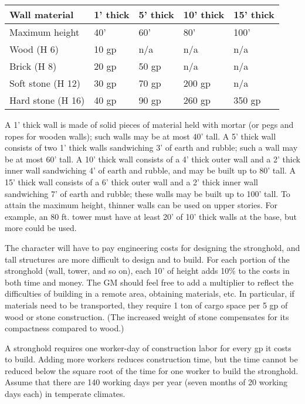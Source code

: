 \documentclass[a4paper,twoside,openany,10pt]{book}
\begin{document}
\begin{multicols}{2}
\begin{tabularx}{0.45\textwidth}{@{}lXXXX@{}}
\textbf{Wall material} & \textbf{1' thick} & \textbf{5' thick} &
\textbf{10' thick} & \textbf{15' thick} \\\toprule
Maximum height & 40' & 60' & 80' & 100' \\\hline
Wood (H 6) & 10 gp & n/a & n/a & n/a \\\hline
Brick (H 8) & 20 gp & 50 gp & n/a & n/a \\\hline
Soft stone (H 12) & 30 gp & 70 gp & 200 gp & n/a \\\hline
Hard stone (H 16) & 40 gp & 90 gp & 260 gp & 350 gp \\\bottomrule
\end{tabularx}\medskip

A 1' thick wall is made of solid pieces of material held with mortar (or pegs and ropes for wooden walls); such walls may be at most 40' tall. A 5' thick wall consists of two 1' thick walls sandwiching 3' of earth and rubble; such a wall may be at most 60' tall. A 10' thick wall consists of a 4' thick outer wall and a 2' thick inner wall sandwiching 4' of earth and rubble, and may be built up to 80' tall. A 15' thick wall consists of a 6' thick outer wall and a 2' thick inner wall sandwiching 7' of earth and rubble; these walls may be built up to 100' tall. To attain the maximum height, thinner walls can be used on upper stories. For example, an 80 ft. tower must have at least 20' of 10' thick walls at the base, but more could be used.

The character will have to pay engineering costs for designing the stronghold, and tall structures are more difficult to design and to build. For each portion of the  stronghold (wall, tower, and so on), each 10' of height adds 10\% to the costs in both time and money. The GM should feel free to add a multiplier to reflect the difficulties of building in a remote area, obtaining materials, etc. In particular, if materials need to be transported, they require 1 ton of cargo space per 5 gp of wood or stone construction. (The increased weight of stone compensates for its compactness compared to wood.)

A stronghold requires one worker-day of construction labor for every gp it costs to build. Adding more workers reduces construction time, but the time cannot be reduced below the square root of the time for one worker to build the stronghold. Assume that there are 140 working days per year (seven months of 20 working days each) in temperate climates.


\end{multicols}
\end{document}
